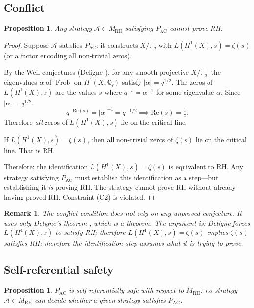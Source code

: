 \documentclass[12pt]{article}
\newtheorem{proposition}[theorem]{Proposition}
\newtheorem{remark}[theorem]{Remark}
\DeclareMathOperator{\Frob}{Frob}
\newcommand{\FF}{\mathbb{F}}
\newcommand{\Ql}{\mathbb{Q}_\ell}
\newcommand{\MRH}{M_{\mathrm{RH}}}
\newcommand{\PAC}{P_{\mathrm{AC}}}
\begin{document}
\subsection{Conflict}

\begin{proposition}
\label{prop:conflict}
Any strategy $\mathcal{A} \in \MRH$ satisfying $\PAC$ cannot prove RH.
\end{proposition}

\begin{proof}
Suppose $\mathcal{A}$ satisfies $\PAC$: it constructs $X/\FF_q$ with
$L(H^1(X), s) = \zeta(s)$ (or a factor encoding all non-trivial zeros).

By the Weil conjectures (Deligne \cite{deligne1974}), for any smooth
projective $X/\FF_q$, the eigenvalues $\alpha$ of $\Frob$ on
$H^1(X, \Ql)$ satisfy $|\alpha| = q^{1/2}$. The zeros of
$L(H^1(X), s)$ are the values $s$ where $q^{-s} = \alpha^{-1}$ for
some eigenvalue $\alpha$. Since $|\alpha| = q^{1/2}$:
\[
q^{-\mathrm{Re}(s)} = |\alpha|^{-1} = q^{-1/2}
\implies \mathrm{Re}(s) = \tfrac{1}{2}.
\]
Therefore \emph{all} zeros of $L(H^1(X), s)$ lie on the critical line.

If $L(H^1(X), s) = \zeta(s)$, then all non-trivial zeros of $\zeta(s)$
lie on the critical line. That is RH.

Therefore: the identification $L(H^1(X), s) = \zeta(s)$ is equivalent
to RH. Any strategy satisfying $\PAC$ must establish this identification
as a step---but establishing it \emph{is} proving RH. The strategy
cannot prove RH without already having proved RH. Constraint (C2) is
violated.
\end{proof}

\begin{remark}
The conflict condition does not rely on any unproved conjecture. It
uses only Deligne's theorem \cite{deligne1974}, which is a theorem.
The argument is: Deligne forces $L(H^1(X),s)$ to satisfy RH; therefore
$L(H^1(X),s) = \zeta(s)$ implies $\zeta(s)$ satisfies RH; therefore
the identification step assumes what it is trying to prove.
\end{remark}

\subsection{Self-referential safety}

\begin{proposition}
\label{prop:safety}
$\PAC$ is self-referentially safe with respect to $\MRH$: no strategy
$\mathcal{A} \in \MRH$ can decide whether a given strategy satisfies
$\PAC$.
\end{proposition}
\end{document}
